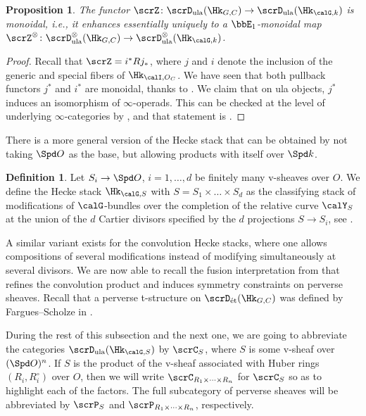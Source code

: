 \documentclass[10pt, reqno]{amsart}
\theoremstyle{plain}
\newtheorem{proposition}[theorem]{Proposition}
\theoremstyle{definition}
\newtheorem{definition}[theorem]{Definition}
\numberwithin{equation}{section}
\begin{document}
	\begin{proposition}\label{prop_Z_monoidal}
		The functor $\scrZ \colon \scrD_{\mathrm{ula}}(\Hk_{G,C}) \to \scrD_{\mathrm{ula}}(\Hk_{\calG,k})$ is monoidal, i.e., it enhances essentially uniquely to a $\bbE_1$-monoidal map $\scrZ^\otimes \colon \scrD_{\mathrm{ula}}^{\otimes}(\Hk_{G,C}) \to \scrD_{\mathrm{ula}}^{\otimes}(\Hk_{\calG,k})$.
	\end{proposition}
	
	\begin{proof}
		Recall that $\scrZ=i^*Rj_*$, where $j$ and $i$ denote the inclusion of the generic and special fibers of $\Hk_{\calI, O_C}$. We have seen that both pullback functors $j^*$ and $i^*$ are monoidal, thanks to . We claim that on ula objects, $j^*$ induces an isomorphism of $\infty$-operads. This can be checked at the level of underlying $\infty$-categories by \cite[Remark 2.1.3.8]{Lur17}, and that statement is \cite[Proposition 6.12]{AGLR22}.
	\end{proof}
	
	There is a more general version of the Hecke stack that can be obtained by not taking $\Spd O$ as the base, but allowing products with itself over $\Spd k$.
	
	\begin{definition}
		Let $S_i \to \Spd O$, $i=1,\dots,d$ be finitely many v-sheaves over $O$. We define the Hecke stack $\Hk_{\calG,S}$ with $S=S_1\times \dots \times S_d$ as the classifying stack of modifications of $\calG$-bundles over the completion of the relative curve $\calY_S$ at the union of the $d$ Cartier divisors specified by the $d$ projections $S\to S_i$, see \cite[Definition VI.1.6]{FS21}.
	\end{definition}
	
	A similar variant exists for the convolution Hecke stacks, where one allows compositions of several modifications instead of modifying simultaneously at several divisors. We are now able to recall the fusion interpretation from \cite[Section VI.9]{FS21} that refines the convolution product and induces symmetry constraints on perverse sheaves. Recall that a perverse t-structure on $\scrD_{\mathrm{\acute{e}t}}(\Hk_{G,C})$ was defined by Fargues--Scholze in \cite[Definition/Proposition VI.7.1]{FS21}.
	
	During the rest of this subsection and the next one, we are going to abbreviate the categories $\scrD_{\mathrm{ula}}(\Hk_{\calG, S})$ by $\scrC_S$, where $S$ is some v-sheaf over $(\Spd O)^n$. If $S$ is the product of the v-sheaf associated with Huber rings $(R_i,R_i^\circ)$ over $O$, then we will write $\scrC_{R_1\times \dots \times R_n}$ for $\scrC_S$ so as to highlight each of the factors. The full subcategory of perverse sheaves will be abbreviated by $\scrP_S$ and $\scrP_{R_1\times \dots \times R_n}$, respectively.
	
\end{document}
